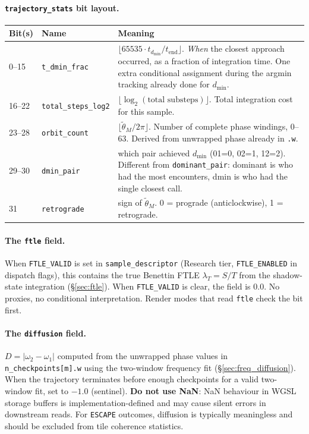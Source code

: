 \documentclass[11pt]{report}
\begin{document}
\paragraph{\texttt{trajectory\_stats} bit layout.}
\begin{center}
\begin{tabular}{llp{8.5cm}}
\toprule
Bit(s) & Name & Meaning \\
\midrule
0--15 & \texttt{t\_dmin\_frac} & $\lfloor 65535\cdot t_{d_{\min}}/t_{\mathrm{end}}\rfloor$. \emph{When} the closest approach occurred, as a fraction of integration time. One extra conditional assignment during the argmin tracking already done for $d_{\min}$. \\
16--22 & \texttt{total\_steps\_log2} & $\lfloor\log_2(\text{total substeps})\rfloor$. Total integration cost for this sample. \\
23--28 & \texttt{orbit\_count} & $\lfloor\tilde\theta_M/2\pi\rfloor$. Number of complete phase windings, 0--63. Derived from unwrapped phase already in \texttt{.w}. \\
29--30 & \texttt{dmin\_pair} & which pair achieved $d_{\min}$ (01=0, 02=1, 12=2). Different from \texttt{dominant\_pair}: dominant is who had the most encounters, dmin is who had the single closest call. \\
31 & \texttt{retrograde} & sign of $\tilde\theta_M$. 0 = prograde (anticlockwise), 1 = retrograde. \\
\bottomrule
\end{tabular}
\end{center}

\paragraph{The \texttt{ftle} field.} When \texttt{FTLE\_VALID} is set in \texttt{sample\_descriptor} (Research tier, \texttt{FTLE\_ENABLED} in dispatch flags), this contains the true Benettin FTLE $\lambda_T=S/T$ from the shadow-state integration (\S\ref{sec:ftle}). When \texttt{FTLE\_VALID} is clear, the field is 0.0. No proxies, no conditional interpretation. Render modes that read \texttt{ftle} check the bit first.

\paragraph{The \texttt{diffusion} field.} $D=|\omega_2-\omega_1|$ computed from the unwrapped phase values in \texttt{n\_checkpoints[m].w} using the two-window frequency fit (\S\ref{sec:freq_diffusion}). When the trajectory terminates before enough checkpoints for a valid two-window fit, set to $-1.0$ (sentinel). \textbf{Do not use NaN}: NaN behaviour in WGSL storage buffers is implementation-defined and may cause silent errors in downstream reads. For \texttt{ESCAPE} outcomes, diffusion is typically meaningless and should be excluded from tile coherence statistics.
\end{document}
